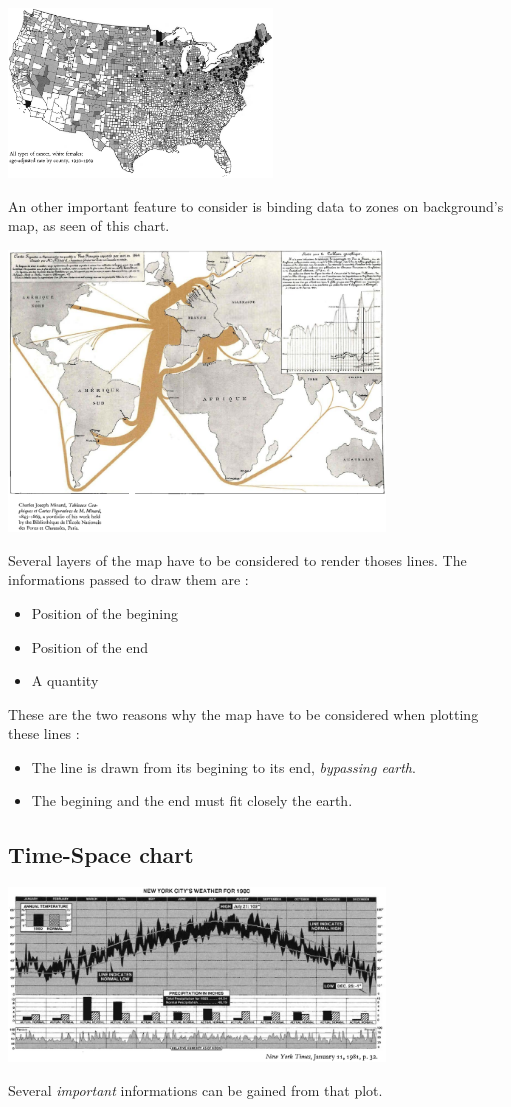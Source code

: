 \centerline{
\includegraphics[width=07cm]{./illustrations/annexes/carte_cancer.eps}
}
An other important feature to consider is binding data to zones on background's map, as seen of this chart.

\centerline{
\includegraphics[width=10cm]{./illustrations/annexes/carte_exports.eps}
}
Several layers of the map have to be considered to render thoses lines. The informations passed to draw them are :
\begin{itemize}
\item Position of the begining
\item Position of the end
\item A quantity
\end{itemize}
These are the two reasons why the map have to be considered when plotting these lines :
\begin{itemize}
\item The line is drawn from its begining to its end, \emph{bypassing earth}.
\item The begining and the end must fit closely the earth. 
\end{itemize}

\subsection{Time-Space chart}
\centerline{
\includegraphics[width=10cm]{./illustrations/annexes/temps_nymeteo.eps}
}
Several \emph{important} informations can be gained from that plot.

